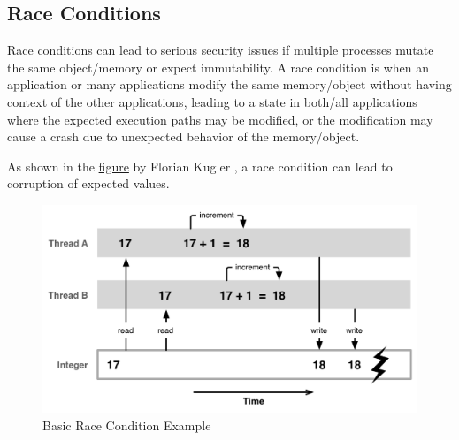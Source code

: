 \documentclass{IEEEtran}
\begin{document}
        \subsection{Race Conditions}
            Race conditions can lead to serious security issues if multiple processes mutate the same 
            object/memory or expect immutability. A race condition is when an application or many 
            applications modify the same memory/object without having context of the other applications,
            leading to a state in both/all applications where the expected execution paths may be 
            modified, or the modification may cause a crash due to unexpected behavior of the 
            memory/object. 

            As shown in the \hyperref[fig:race-condition]{\color{blue}figure} by Florian Kugler
            \cite{Florian-Kugler}, a race condition can 
            lead to corruption of expected values.
            \begin{figure}[h]
                \includegraphics[width=\linewidth]{Images/race-condition.png}
                \caption{Basic Race Condition Example}
                \label{fig:race-condition}
            \end{figure}
\end{document}
